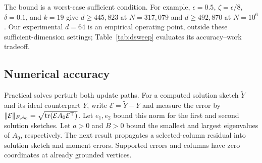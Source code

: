 The bound is a worst-case sufficient condition. For example,
$\epsilon=0.5$, $\zeta=\epsilon/8$, $\delta=0.1$, and $k=19$
give $d\geq445{,}823$ at $N=317{,}079$ and
$d\geq492{,}870$ at $N=10^6$. Our experimental $d=64$ is an
empirical operating point, outside these sufficient-dimension
settings; Table~\ref{tab:dsweep} evaluates its accuracy--work tradeoff.

\subsection{Numerical accuracy}
Practical solves perturb both update paths. For a computed solution sketch
$\widetilde Y$ and its ideal counterpart $Y$, write
$\mathcal E=\widetilde Y-Y$ and measure the error by
$\|\mathcal E\|_{F,A_0}=\sqrt{\operatorname{tr}(\mathcal E A_0\mathcal E^\top)}$.
Let $e_1,e_2$ bound this norm for the first and second solution sketches.
Let $a>0$ and $B>0$ bound the smallest and largest eigenvalues
of $A_0$, respectively. The next result propagates a selected-column
residual into solution sketch and moment errors. Supported errors
and columns have zero coordinates at already grounded vertices.

